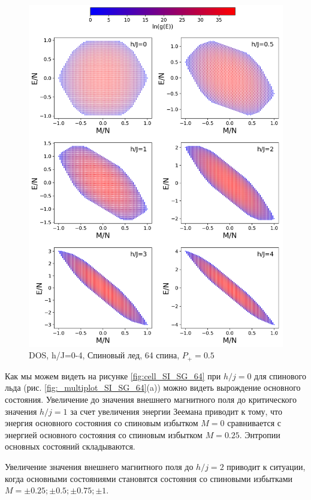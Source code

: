 \documentclass[utf8, babel, sor, jor, amsmath, amssymb, reprint]{elsarticle} %
\begin{document}
\begin{figure}[H]
	\centering
	\includegraphics[width=1\linewidth]{pictures/HDOS_SI_64_J0.png}
	\caption{DOS, h/J=0-4, Спиновый лед, 64 спина, $P_+ = 0.5$}
	\label{fig:HDOS_ice}
\end{figure}


Как мы можем видеть на рисунке \ref{fig:cell_SI_SG_64} при $h/j=0$ для спинового льда (рис. \ref{fig:_multiplot_SI_SG_64}(a)) можно видеть вырождение основного состояния. Увеличение до значения внешнего магнитного поля до критического значения $h/j=1$ за счет увеличения энергии Зеемана приводит к тому, что энергия основного состояния со спиновым избытком $M=0$ сравнивается с энергией основного состояния со спиновым избытком $M=0.25$. Энтропии основных состояний складываются.

Увеличение значения внешнего магнитного поля до $h/j=2$ приводит к ситуации, когда основными состояниями становятся состояния со спиновыми избытками $M=\pm0.25; \pm0.5; \pm0.75; \pm1$.
\end{document}
